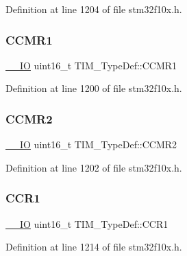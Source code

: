 Definition at line 1204 of file stm32f10x.\+h.

\mbox{\label{struct_t_i_m___type_def_a9094f9bb312461d2fc1499f5f8d91c64}} 
\subsubsection{\texorpdfstring{C\+C\+M\+R1}{CCMR1}}
{\footnotesize\ttfamily \hyperlink{core__sc300_8h_aec43007d9998a0a0e01faede4133d6be}{\+\_\+\+\_\+\+IO} uint16\+\_\+t T\+I\+M\+\_\+\+Type\+Def\+::\+C\+C\+M\+R1}



Definition at line 1200 of file stm32f10x.\+h.

\mbox{\label{struct_t_i_m___type_def_a22bb9f39aae46365d3ec3c5973f90039}} 
\subsubsection{\texorpdfstring{C\+C\+M\+R2}{CCMR2}}
{\footnotesize\ttfamily \hyperlink{core__sc300_8h_aec43007d9998a0a0e01faede4133d6be}{\+\_\+\+\_\+\+IO} uint16\+\_\+t T\+I\+M\+\_\+\+Type\+Def\+::\+C\+C\+M\+R2}



Definition at line 1202 of file stm32f10x.\+h.

\mbox{\label{struct_t_i_m___type_def_a537cdfa9f0229951c2d624be6de74977}} 
\subsubsection{\texorpdfstring{C\+C\+R1}{CCR1}}
{\footnotesize\ttfamily \hyperlink{core__sc300_8h_aec43007d9998a0a0e01faede4133d6be}{\+\_\+\+\_\+\+IO} uint16\+\_\+t T\+I\+M\+\_\+\+Type\+Def\+::\+C\+C\+R1}



Definition at line 1214 of file stm32f10x.\+h.

